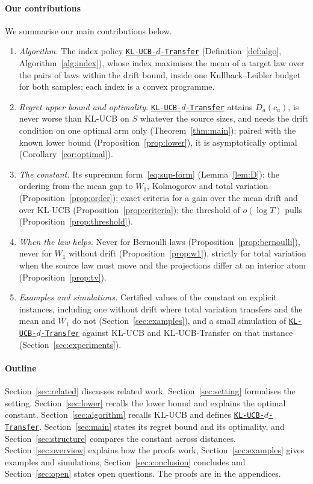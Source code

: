 \documentclass[11pt]{article}
\newcommand{\Alg}{\hyperref[alg:index]{\texttt{KL-UCB-$d$-Transfer}}}
\begin{document}
\paragraph{Our contributions} We summarise our main contributions below.
\begin{enumerate}
\item[(i)] \emph{Algorithm.} The index policy \Alg{} (Definition~\ref{def:algo},
  Algorithm~\ref{alg:index}), whose index maximises the mean of a target law over the pairs of laws
  within the drift bound, inside one Kullback--Leibler budget for both samples; each index is a
  convex programme.
\item[(ii)] \emph{Regret upper bound and optimality.} \Alg{} attains $D_a(c_a)$, is never worse
  than KL-UCB on $S$ whatever the source sizes, and needs the drift condition on one optimal arm only
  (Theorem~\ref{thm:main}); paired with the known lower bound (Proposition~\ref{prop:lower}), it is
  asymptotically optimal (Corollary~\ref{cor:optimal}).
\item[(iii)] \emph{The constant.} Its supremum form~\eqref{eq:sup-form} (Lemma~\ref{lem:D}); the
  ordering from the mean gap to $W_1$, Kolmogorov and total variation
  (Proposition~\ref{prop:order}); exact criteria for a gain over the mean drift and over KL-UCB
  (Proposition~\ref{prop:criteria}); the threshold of $o(\log T)$ pulls
  (Proposition~\ref{prop:threshold}).
\item[(iv)] \emph{When the law helps.} Never for Bernoulli laws (Proposition~\ref{prop:bernoulli}),
  never for $W_1$ without drift (Proposition~\ref{prop:w1}), strictly for total variation when the
  source law must move and the projections differ at an interior atom (Proposition~\ref{prop:tv}).
\item[(v)] \emph{Examples and simulations.} Certified values of the constant on explicit
  instances, including one without drift where total variation transfers and the mean and $W_1$ do
  not (Section~\ref{sec:examples}), and a small simulation of \Alg{} against KL-UCB and
  KL-UCB-Transfer on that instance (Section~\ref{sec:experiments}).
\end{enumerate}

\paragraph{Outline} Section~\ref{sec:related} discusses related work. Section~\ref{sec:setting}
formalises the setting. Section~\ref{sec:lower} recalls the lower bound and explains the optimal
constant. Section~\ref{sec:algorithm} recalls KL-UCB and defines \Alg{}. Section~\ref{sec:main}
states its regret bound and its optimality, and Section~\ref{sec:structure} compares the constant
across distances. Section~\ref{sec:overview} explains how the proofs work,
Section~\ref{sec:examples} gives examples and simulations, Section~\ref{sec:conclusion} concludes and
Section~\ref{sec:open} states open questions. The proofs are in the appendices.
\end{document}
